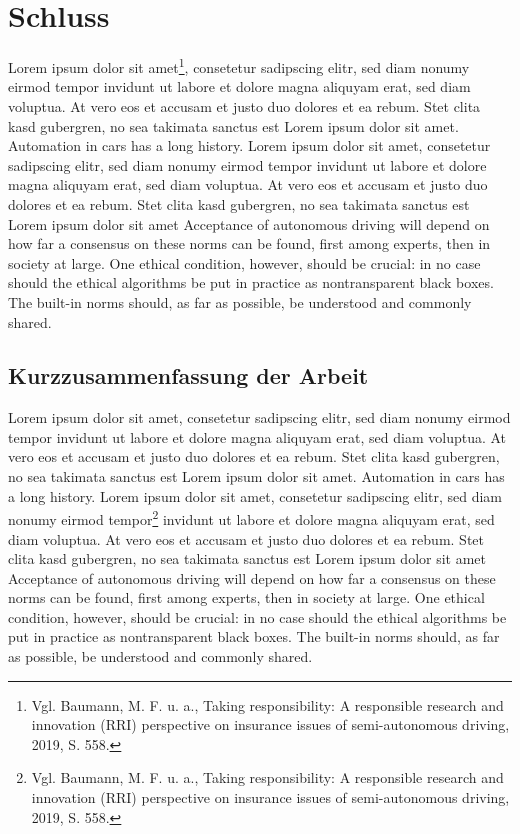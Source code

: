 \chapter{Schluss}

Lorem ipsum dolor sit amet\footnote{Vgl. Baumann, M. F. u. a., Taking responsibility: A responsible research and innovation (RRI) perspective on insurance issues of semi-autonomous driving, 2019, S. 558.}, consetetur sadipscing elitr, sed diam nonumy eirmod tempor invidunt ut labore et dolore magna aliquyam erat, sed diam voluptua. 
At vero eos et accusam et justo duo dolores et ea rebum. 
Stet clita kasd gubergren, no sea takimata sanctus est Lorem ipsum dolor sit amet. 
Automation in cars has a long history.  Lorem ipsum dolor sit amet, consetetur sadipscing elitr, sed diam nonumy eirmod tempor invidunt ut labore et dolore magna aliquyam erat, sed diam voluptua. 
At vero eos et accusam et justo duo dolores et ea rebum. 
Stet clita kasd gubergren, no sea takimata sanctus est Lorem ipsum dolor sit amet Acceptance of autonomous driving will depend on how far a consensus on these norms can be found, first among experts, then in society at large. 
One ethical condition, however, should be crucial: in no case should the ethical algorithms be put in practice as nontransparent black boxes. 
The built-in norms should, as far as possible, be understood and commonly shared.

\section{Kurzzusammenfassung der Arbeit}

Lorem ipsum dolor sit amet, consetetur sadipscing elitr, sed diam nonumy eirmod tempor invidunt ut labore et dolore magna aliquyam erat, sed diam voluptua. 
At vero eos et accusam et justo duo dolores et ea rebum. 
Stet clita kasd gubergren, no sea takimata sanctus est Lorem ipsum dolor sit amet. 
Automation in cars has a long history.  Lorem ipsum dolor sit amet, consetetur sadipscing elitr, sed diam nonumy eirmod tempor\footnote{Vgl. Baumann, M. F. u. a., Taking responsibility: A responsible research and innovation (RRI) perspective on insurance issues of semi-autonomous driving, 2019, S. 558.} invidunt ut labore et dolore magna aliquyam erat, sed diam voluptua. 
At vero eos et accusam et justo duo dolores et ea rebum. 
Stet clita kasd gubergren, no sea takimata sanctus est Lorem ipsum dolor sit amet Acceptance of autonomous driving will depend on how far a consensus on these norms can be found, first among experts, then in society at large. 
One ethical condition, however, should be crucial: in no case should the ethical algorithms be put in practice as nontransparent black boxes. 
The built-in norms should, as far as possible, be understood and commonly shared.

